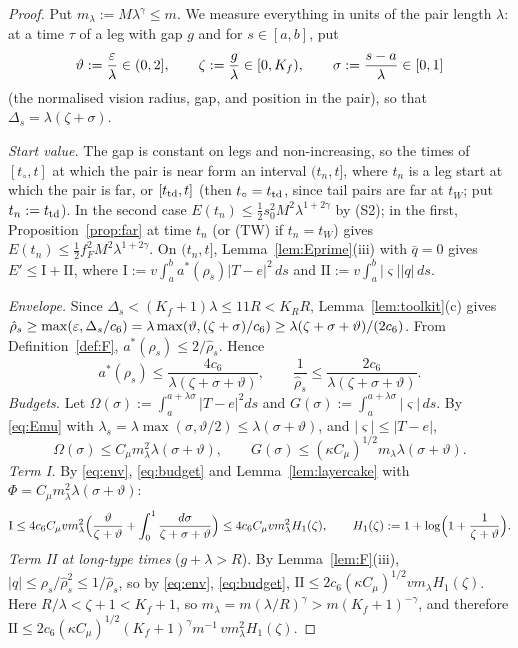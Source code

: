 \begin{proof}
Put $m_\lambda:=M\lambda^\gamma\le m$. We measure everything in units of the pair length $\lambda$: at a time $\tau$ of
a leg with gap $g$ and for $s\in[a,b]$, put
\[
\vartheta:=\frac{\varepsilon}\lambda\in(0,2],\qquad
\zeta:=\frac g\lambda\in[0,K_f),\qquad
\sigma:=\frac{s-a}\lambda\in[0,1]
\]
(the normalised vision radius, gap, and position in the pair), so that $\Delta_s=\lambda(\zeta+\sigma)$.

\emph{Start value.} The gap is constant on legs and non-increasing, so the times of $[t_\circ,t]$ at which the pair is
near form an interval $(t_n,t]$, where $t_n$ is a leg start at which the pair is far, or $[t_{\mathrm{td}},t]$ (then $t_\circ=t_{\mathrm{td}}$,
since tail pairs are far at $t_W$; put $t_n:=t_{\mathrm{td}}$). In the second case $E(t_n)\le\frac12s_0^2M^2\lambda^{1+2\gamma}$ by
(S2); in the first, Proposition~\ref{prop:far} at time $t_n$ (or (TW) if $t_n=t_W$) gives
$E(t_n)\le\frac12f_F^2M^2\lambda^{1+2\gamma}$. On $(t_n,t]$, Lemma~\ref{lem:Eprime}(iii) with $\bar q=0$ gives
$E'\le\mathrm I+\mathrm{II}$, where $\mathrm I:=v\int_a^ba^*(\rho_s)|T-e|^2\,ds$ and $\mathrm{II}:=v\int_a^b|\varsigma||q|\,ds$.

\emph{Envelope.} Since $\Delta_s<(K_f+1)\lambda\le11R<K_RR$, Lemma~\ref{lem:toolkit}(c) gives $\hat\rho_s\ge\max(\varepsilon,\Delta_s/c_6)
=\lambda\max(\vartheta,(\zeta+\sigma)/c_6)\ge\lambda(\zeta+\sigma+\vartheta)/(2c_6)$. From Definition~\ref{def:F},
$a^*(\rho_s)\le2/\hat\rho_s$. Hence
\begin{equation}\label{eq:env}
a^*(\rho_s)\le\frac{4c_6}{\lambda(\zeta+\sigma+\vartheta)},\qquad\frac1{\hat\rho_s}\le\frac{2c_6}{\lambda(\zeta+\sigma+\vartheta)} .
\end{equation}
\emph{Budgets.} Let $\Omega(\sigma):=\int_a^{a+\lambda\sigma}|T-e|^2ds$ and $G(\sigma):=\int_a^{a+\lambda\sigma}|\varsigma|\,ds$.
By \eqref{eq:Emu} with $\lambda_s=\lambda\max(\sigma,\vartheta/2)\le\lambda(\sigma+\vartheta)$, and $|\varsigma|\le|T-e|$,
\begin{equation}\label{eq:budget}
\Omega(\sigma)\le C_\mu m_\lambda^2\lambda(\sigma+\vartheta),\qquad G(\sigma)\le(\kappa C_\mu)^{1/2}m_\lambda\lambda(\sigma+\vartheta).
\end{equation}
\emph{Term I.} By \eqref{eq:env}, \eqref{eq:budget} and Lemma~\ref{lem:layercake} with $\Phi=C_\mu m_\lambda^2\lambda(\sigma+\vartheta)$:
\[
\mathrm I\le4c_6C_\mu vm_\lambda^2\Bigl(\frac\vartheta{\zeta+\vartheta}+\int_0^1\frac{d\sigma}{\zeta+\sigma+\vartheta}\Bigr)
\le4c_6C_\mu vm_\lambda^2H_1(\zeta),\qquad H_1(\zeta):=1+\log\Bigl(1+\frac1{\zeta+\vartheta}\Bigr).
\]
\emph{Term II at long-type times} ($g+\lambda>R$). By Lemma~\ref{lem:F}(iii), $|q|\le\rho_s/\hat\rho_s^2\le1/\hat\rho_s$, so by
\eqref{eq:env}, \eqref{eq:budget}, $\mathrm{II}\le2c_6(\kappa C_\mu)^{1/2}vm_\lambda H_1(\zeta)$. Here
$R/\lambda<\zeta+1<K_f+1$, so $m_\lambda=m(\lambda/R)^\gamma>m(K_f+1)^{-\gamma}$, and therefore
$\mathrm{II}\le2c_6(\kappa C_\mu)^{1/2}(K_f+1)^\gamma m^{-1}\,vm_\lambda^2H_1(\zeta)$.


\end{proof}

